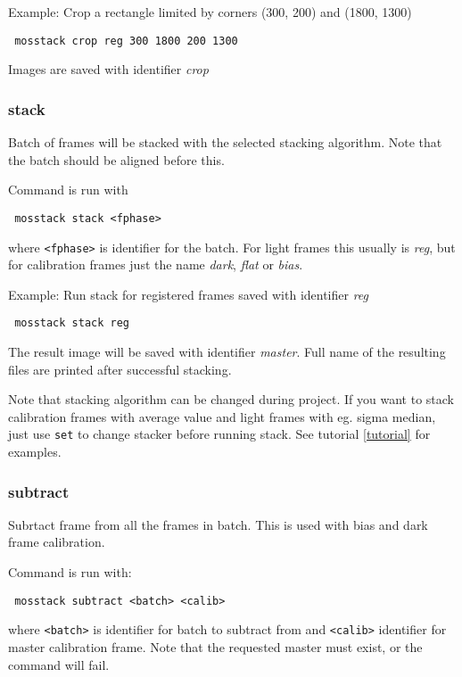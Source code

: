 \documentclass[twoside,a4paper]{refart}
\begin{document}
Example: Crop a rectangle limited by corners (300, 200) and (1800, 1300)

\begin{verbatim}
 mosstack crop reg 300 1800 200 1300
\end{verbatim}

Images are saved with identifier \textit{crop}

\subsubsection{stack}
\label{stacking}
Batch of frames will be stacked with the selected stacking algorithm. Note that the batch should be aligned
before this.

Command is run with

\begin{verbatim}
 mosstack stack <fphase>
\end{verbatim}

where \texttt{<fphase>} is identifier for the batch. For light frames this usually is \textit{reg}, but for
calibration frames just the name \textit{dark}, \textit{flat} or \textit{bias}.

Example: Run stack for registered frames saved with identifier \textit{reg}
\begin{verbatim}
 mosstack stack reg
\end{verbatim}

The result image will be saved with identifier \textit{master}. Full name of the resulting files are printed
after successful stacking.

Note that stacking algorithm can be changed during project. If you want to stack calibration frames with
average value and light frames with eg. sigma median, just use \texttt{set} to change stacker before running
stack. See tutorial \ref{tutorial} for examples.

\subsubsection{subtract}
Subrtact frame from all the frames in batch. This is used with bias and dark frame calibration.

Command is run with:

\begin{verbatim}
 mosstack subtract <batch> <calib>
\end{verbatim}

where \texttt{<batch>} is identifier for batch to subtract from and \texttt{<calib>} identifier for master 
calibration frame. Note that the requested master must exist, or the command will fail.
\end{document}
